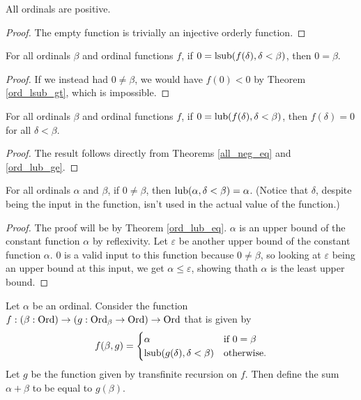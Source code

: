 \documentclass[../../math.tex]{subfiles}
\begin{document}
\begin{instance}
    All ordinals are positive.
\end{instance}
\begin{proof}
    The empty function is trivially an injective orderly function.
\end{proof}

\begin{theorem} \label{ord_lsub_f_zero}
    For all ordinals $\beta$ and ordinal functions $f$, if $0 = \operatorname{lsub}(f(\delta),
    \delta < \beta)$, then $0 = \beta$.
\end{theorem}
\begin{proof}
    If we instead had $0 \neq \beta$, we would have $f(0) < 0$ by Theorem
    \ref{ord_lsub_gt}, which is impossible.
\end{proof}

\begin{theorem} \label{ord_lub_f_zero}
    For all ordinals $\beta$ and ordinal functions $f$, if $0 = \operatorname{lub}(f(\delta),
    \delta < \beta)$, then $f(\delta) = 0$ for all $\delta < \beta$.
\end{theorem}
\begin{proof}
    The result follows directly from Theorems \ref{all_neg_eq} and
    \ref{ord_lub_ge}.
\end{proof}

\begin{theorem} \label{ord_lub_constant}
    For all ordinals $\alpha$ and $\beta$, if $0 \neq \beta$, then $\operatorname{lub}(\alpha,
    \delta < \beta) = \alpha$.  (Notice that $\delta$, despite being the input
    in the function, isn't used in the actual value of the function.)
\end{theorem}
\begin{proof}
    The proof will be by Theorem \ref{ord_lub_eq}.  $\alpha$ is an upper bound
    of the constant function $\alpha$ by reflexivity.  Let $\varepsilon$ be
    another upper bound of the constant function $\alpha$.  $0$ is a valid input
    to this function because $0 \neq \beta$, so looking at $\varepsilon$ being
    an upper bound at this input, we get $\alpha \leq \varepsilon$, showing
    thath $\alpha$ is the least upper bound.
\end{proof}

\begin{instance}
    Let $\alpha$ be an ordinal.  Consider the function $f : (\beta : \operatorname{Ord}) \to
    (g : \operatorname{Ord}_\beta \to \operatorname{Ord}) \to \operatorname{Ord}$ that is given by
    \[
        f(\beta, g) = \begin{cases}
            \alpha &\text{if $0 = \beta$} \\
            \operatorname{lsub}(g(\delta), \delta < \beta) &\text{otherwise.}
        \end{cases}
    \]
    Let $g$ be the function given by transfinite recursion on $f$.  Then define
    the sum $\alpha + \beta$ to be equal to $g(\beta)$.
\end{instance}
\end{document}
